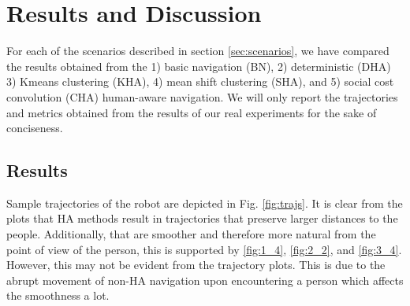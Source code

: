 \section{Results and Discussion}

For each of the scenarios described in section \ref{sec:scenarios}, we have compared the results obtained from the 1) basic navigation (BN), 2) deterministic (DHA) 3) Kmeans clustering (KHA), 4) mean shift clustering (SHA), and 5) social cost convolution (CHA) human-aware navigation. We will only report the trajectories and metrics obtained from the results of our real experiments for the sake of conciseness.






\subsection{Results}
\label{sec:results}

Sample trajectories of the robot are depicted in Fig. \ref{fig:trajs}. It is clear from the plots that HA methods result in trajectories that preserve larger distances to the people. Additionally, that are smoother and therefore more natural from the point of view of the person, this is supported by \ref{fig:1_4}, \ref{fig:2_2}, and \ref{fig:3_4}. However, this may not be evident from the trajectory plots. This is due to the abrupt movement of non-HA navigation upon encountering a person which affects the smoothness a lot. 

